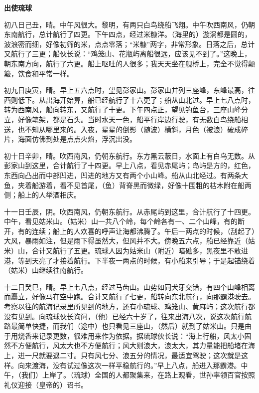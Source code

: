 \documentclass[12pt,UTF-8,openany]{ctexbook}
\begin{document}
\vspace{-1em}

\begin{normalsize}
    
\begin{center}
    \textbf{出使琉球}
\end{center}
    
    初八日己丑，晴。中午风很大。黎明，有两只白鸟绕船飞翔。中午吹西南风，仍朝东南航行，总计航行了四更。下午四点，经过米糠洋。（海里的）漩涡都是圆的，波浪密而细，好像初筛的米，点点零落；“米糠”两字，非常形象。日落之后，总计又航行了三更；船伙长说：“鸡笼山、花瓶屿离船很远，应该见不到了。”这晚上，朝东南方向，航行了六更。船上呕吐的人很多；我天天坐在舰桥上，完全不觉得颠簸，饮食和平常一样。
    
    初九日庚寅，晴。早上五六点时，望见彭家山。彭家山并列三座峰，东峰最高，往西则低下。从出海开始算，船已经航行了十六更了；船从山北过。早上七八点时，转为西南风，船向转东，又航行了十更。下午四点正，望见钓鱼台，三座山峰分立，好像笔架，都是石头。当时水天一色，船平行岸边行驶，有无数白鸟绕船相送，也不知从哪里来的。入夜，星星的倒影（随波）横斜，月色（被浪）破成碎片，海面仿佛到处是点点火焰，浮沉出没。
    
    初十日辛卯，晴。吹西南风，仍朝东航行。东方黑云蔽日，水面上有白鸟无数。从彭家山到这里，合计航行了十四更。早上八点，看见赤尾屿；岛屿是方的，红色，东西向凸出而中部凹进，凹进的地方又有两个小山峰。船从山北经过。有两条大鱼，夹着船游着，看不见首尾，（鱼）背脊黑而微绿，好像十围粗的枯木附在船两侧；船上的人举酒相庆。
    
    十一日壬辰，阴。吹西南风，仍朝东航行。从赤尾屿到这里，合计航行了十四更。中午，看见姑米山。（姑米）山一共八个岭，每个岭各有一、二个山峰，有的断开，有的连续；船上的人欢喜的呼声让海都沸腾了。午后一两点的时候，（刮起了）大风，暴雨如注，但是雨下得虽然大，但风并不大。傍晚五六点，船已经靠近（姑米）山，合计又航行了五更。琉球人因为姑米山（附近）暗礁多，黑夜里不敢进港，等到天亮了才接着航行。下半夜一两点的时候，有小船来引导；于是起锚绕着（姑米）山继续往南航行。
    
    十二日癸巳，晴。早上七八点，经过马齿山。山势如同犬牙交错，有四个山峰相离而矗立，好像马在空中跑。合计又航行了七更，船转向东北航行，向那霸港驶去。考察以往的航海记录里所见到的地方，还有小琉球、鸡笼山、黄麻屿；这次航行都没有见到。向琉球伙长询问，（他）已经六十岁了，往来出海八次，说这次航行航路最简单快捷，而我们（途中）也只看见三座山，（然后）就到了姑米山。只是由于用烧香来记录更数，很难用来作为依据。据琉球伙长说：“海上行船，风太小固然不方便航行，风太大也不方便航行；风大则浪大，浪太大，其力量能把船堵在海上，进一尺就要退二寸。只有风七分、浪五分的情况，最适宜驾驶；这次就是这样。向来渡海，没有试过像这次一样平稳航行的。”早上八点，船进入那霸港。中午，（我们）上岸了。（琉球）全国的人都聚集来，在路上观看，世孙率领百官按照礼仪迎接（皇帝的）诏书。
    

\end{normalsize}
\end{document}

